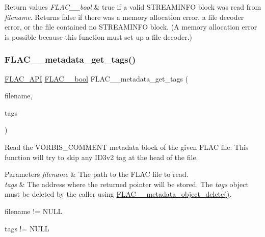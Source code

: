 \begin{DoxyRetVals}{Return values}
{\em F\+L\+A\+C\+\_\+\+\_\+bool} & {\ttfamily true} if a valid S\+T\+R\+E\+A\+M\+I\+N\+FO block was read from {\itshape filename}. Returns {\ttfamily false} if there was a memory allocation error, a file decoder error, or the file contained no S\+T\+R\+E\+A\+M\+I\+N\+FO block. (A memory allocation error is possible because this function must set up a file decoder.) \\
\hline
\end{DoxyRetVals}
\mbox{\label{group__flac__metadata__level0_gaf66469f31dca28837ffd3f8b0ec5c082}} 
\subsubsection{\texorpdfstring{F\+L\+A\+C\+\_\+\+\_\+metadata\+\_\+get\+\_\+tags()}{FLAC\_\_metadata\_get\_tags()}}
{\footnotesize\ttfamily \hyperlink{group__flac__export_ga56ca07df8a23310707732b1c0007d6f5}{F\+L\+A\+C\+\_\+\+A\+PI} \hyperlink{ordinals_8h_a95103469f1cbd78b8cf250194985b34e}{F\+L\+A\+C\+\_\+\+\_\+bool} F\+L\+A\+C\+\_\+\+\_\+metadata\+\_\+get\+\_\+tags (\begin{DoxyParamCaption}\item[{\hyperlink{zconf_8h_a2c212835823e3c54a8ab6d95c652660e}{const} char $\ast$}]{filename,  }\item[{\hyperlink{struct_f_l_a_c_____stream_metadata}{F\+L\+A\+C\+\_\+\+\_\+\+Stream\+Metadata} $\ast$$\ast$}]{tags }\end{DoxyParamCaption})}

Read the V\+O\+R\+B\+I\+S\+\_\+\+C\+O\+M\+M\+E\+NT metadata block of the given F\+L\+AC file. This function will try to skip any I\+D3v2 tag at the head of the file.


\begin{DoxyParams}{Parameters}
{\em filename} & The path to the F\+L\+AC file to read. \\
\hline
{\em tags} & The address where the returned pointer will be stored. The {\itshape tags} object must be deleted by the caller using \hyperlink{group__flac__metadata__object_ga66bbe27dba68ba77be5af83986a280ea}{F\+L\+A\+C\+\_\+\+\_\+metadata\+\_\+object\+\_\+delete()}.  
\begin{DoxyCode}
filename != NULL 
\end{DoxyCode}
 
\begin{DoxyCode}
tags != NULL 
\end{DoxyCode}
 \\
\hline
\end{DoxyParams}

